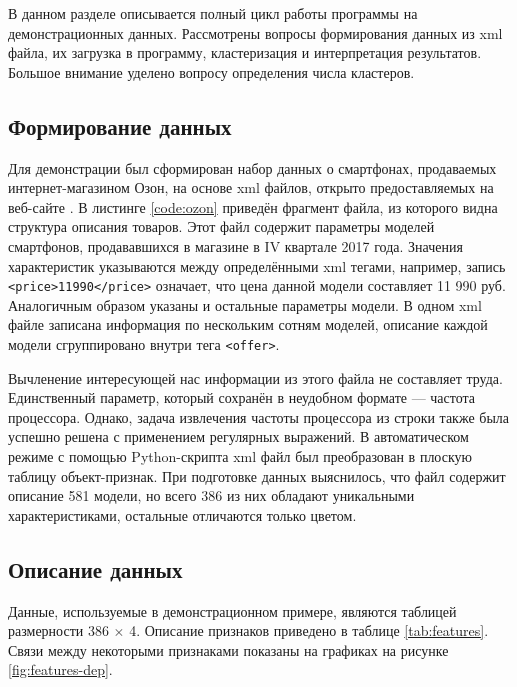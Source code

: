 \documentclass[12pt]{diploma}
\begin{document}
	В данном разделе описывается полный цикл работы программы на демонстрационных данных. Рассмотрены вопросы формирования данных из xml файла, их загрузка в программу, кластеризация и интерпретация результатов. Большое внимание уделено вопросу определения числа кластеров.
	
	\subsection{Формирование данных}
	
	Для демонстрации был сформирован набор данных о смартфонах, продаваемых интернет-магазином Озон, на основе xml файлов, открыто предоставляемых на веб-сайте \cite{ozon-data}. В листинге \ref{code:ozon} приведён фрагмент файла, из которого видна структура описания товаров. Этот файл содержит параметры моделей смартфонов, продававшихся в магазине в IV квартале 2017 года. Значения характеристик указываются между определёнными xml тегами, например, запись \texttt{<price>11990</price>} означает, что цена данной модели составляет 11 990 руб. Аналогичным образом указаны и остальные параметры модели. В одном xml файле записана информация по нескольким сотням моделей, описание каждой модели сгруппировано внутри тега \texttt{<offer>}.
	
		
	
	Вычленение интересующей нас информации из этого файла не составляет труда. Единственный параметр, который сохранён в неудобном формате --- частота процессора. Однако, задача извлечения частоты процессора из строки также была успешно решена с применением регулярных выражений. В автоматическом режиме с помощью Python-скрипта xml файл был преобразован в плоскую таблицу объект-признак. При подготовке данных выяснилось, что файл содержит описание 581 модели, но всего 386 из них обладают уникальными характеристиками, остальные отличаются только цветом.
	
	\subsection{Описание данных}
	Данные, используемые в демонстрационном примере, являются таблицей размерности 386 $ \times $ 4.  Описание признаков приведено в таблице \ref{tab:features}. Связи между некоторыми признаками показаны на графиках на рисунке \ref{fig:features-dep}.
	
\end{document}
